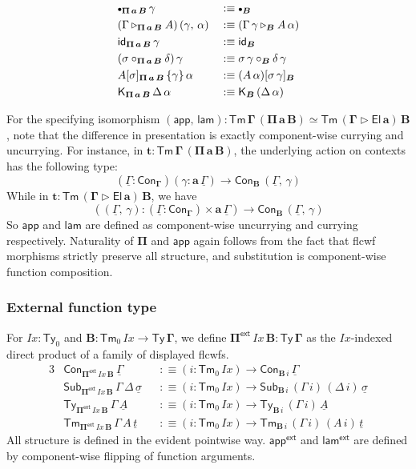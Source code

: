 \documentclass[12pt,a4paper,twoside,openany]{book}
\theoremstyle{remark}
\theoremstyle{definition}
\theoremstyle{theorem}
\newcommand{\mi}[1]{\mathit{#1}}
\newcommand{\ms}[1]{\mathsf{#1}}
\newcommand{\bs}[1]{\boldsymbol{#1}}
\newcommand{\Ix}{\mi{Ix}}
\newcommand{\id}{\mathsf{id}}
\newcommand{\Con}{\mathsf{Con}}
\newcommand{\Sub}{\mathsf{Sub}}
\newcommand{\Tm}{\mathsf{Tm}}
\newcommand{\Ty}{\mathsf{Ty}}
\newcommand{\El}{\mathsf{El}}
\newcommand{\ext}{\triangleright}
\newcommand{\emptycon}{\scaleobj{.75}\bullet}
\newcommand{\Pie}{\Pi^{\mathsf{ext}}}
\newcommand{\appe}{\mathsf{app^{ext}}}
\newcommand{\lame}{\mathsf{lam^{ext}}}
\newcommand{\K}{\mathsf{K}}
\newcommand{\bGamma}{\bs{\Gamma}}
\newcommand{\ba}{\bs{a}}
\newcommand{\bB}{\bs{B}}
\newcommand{\ul}[1]{\underline{#1}}
\newcommand{\ulGamma}{\ul{\Gamma}}
\newcommand{\ulsigma}{\ul{\sigma}}
\newcommand{\ult}{\ul{t}}
\newcommand{\ulA}{\ul{A}}
\newcommand{\app}{\ms{app}}
\newcommand{\lam}{\ms{lam}}
\newcommand{\defn}{:\equiv}
\begin{document}
\begin{alignat*}{3}
  &\emptycon_{\bs{\Pi\,a\,B}}\,\gamma &&\defn \emptycon_{\bB}\\
  &(\Gamma \ext_{\bs{\Pi\,a\,B}} A)\,(\gamma,\,\alpha) &&\defn (\Gamma\,\gamma \ext_{\bB} A\,\alpha)\\
  &\id_{\bs{\Pi\,a\,B}}\,\gamma &&\defn \id_{\bB}\\
  &(\sigma \circ_{\bs{\Pi\,a\,B}} \delta)\,\gamma &&\defn \sigma\,\gamma \circ_{\bB} \delta\,\gamma\\
  &A[\sigma]_{\bs{\Pi\,a\,B}}\,\{\gamma\}\,\alpha &&\defn (A\,\alpha)[\sigma\,\gamma]_{\bB}\\
  &\K_{\bs{\Pi\,a\,B}}\,\Delta\,\alpha &&\defn \K_{\bB}\,(\Delta\,\alpha)
\end{alignat*}

For the specifying isomorphism $\bs{(\app,\,\lam) : \Tm\,\Gamma\,(\Pi\,a\,B)
  \simeq \Tm\,(\Gamma \ext \El\,a)\,B}$, note that the difference in
presentation is exactly component-wise currying and uncurrying. For instance, in
$\bs{t : \Tm\,\Gamma\,(\Pi\,a\,B)}$, the underlying action on contexts has the following
type:
\[
  (\ulGamma : \Con_{\bGamma})(\gamma : \ba\,\ulGamma) \to \Con_{\bB}\,(\ulGamma,\,\gamma)
\]
While in $\bs{t : \Tm\,(\Gamma \ext \El\,a)\,B}$, we have
\[
  ((\ulGamma,\,\gamma) : (\ulGamma : \Con_{\bGamma}) \times \ba\,\ulGamma) \to \Con_{\bB}\,(\ulGamma,\,\gamma)
\]
So $\bs{\app}$ and $\bs{\lam}$ are defined as component-wise uncurrying and
currying respectively.  Naturality of $\bs{\Pi}$ and $\bs{\app}$ again follows
from the fact that flcwf morphisms strictly preserve all structure, and
substitution is component-wise function composition.

\subsubsection{External function type}

For $\Ix : \Ty_0$ and $\bB : \Tm_0\,\Ix \to \bs{\Ty\,\Gamma}$, we define
$\bs{\Pie}\,\Ix\,\bB : \bs{\Ty\,\Gamma}$ as the $\Ix$-indexed direct product of
a family of displayed flcwfs.
\begin{alignat*}{3}
  & \Con_{\bs{\Pie}\,\Ix\,\bB}\,\ulGamma &&\defn (i : \Tm_0\,\Ix) \to \Con_{\bB\,i}\,\ulGamma\\
  & \Sub_{\bs{\Pie}\,\Ix\,\bB}\,\Gamma\,\Delta\,\ulsigma &&\defn (i : \Tm_0\,\Ix) \to \Sub_{\bB\,i}\,(\Gamma\,i)\,(\Delta\,i)\,\ulsigma\\
  &  \Ty_{\bs{\Pie}\,\Ix\,\bB}\,\Gamma\,\ulA &&\defn (i : \Tm_0\,\Ix) \to \Ty_{\bB\,i}\,(\Gamma\,i)\,\ulA\\
  &  \Tm_{\bs{\Pie}\,\Ix\,\bB}\,\Gamma\,A\,\ult &&\defn (i : \Tm_0\,\Ix) \to \Tm_{\bB\,i}\,(\Gamma\,i)\,(A\,i)\,\ult
\end{alignat*}
All structure is defined in the evident pointwise way. $\bs{\appe}$ and $\bs{\lame}$ are
defined by component-wise flipping of function arguments.
\end{document}
